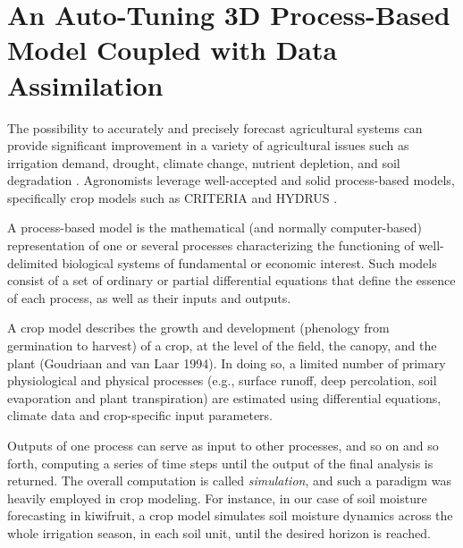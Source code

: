 \chapter{An Auto-Tuning 3D Process-Based Model Coupled with Data Assimilation}
\label{physics-aware-chap:orchard}

The possibility to accurately and precisely forecast agricultural systems can provide significant improvement in a variety of agricultural issues such as irrigation demand, drought, climate change, nutrient depletion, and soil degradation \cite{vitali2021crop}.
Agronomists leverage well-accepted and solid process-based models, specifically crop models such as CRITERIA \cite{Bittelli2011253} and HYDRUS \cite{hydrus2008587}.

\begin{definition}
    A process-based model is the mathematical (and normally computer-based) representation of one or several processes characterizing the functioning of well-delimited biological systems of fundamental or economic interest.
    Such models consist of a set of ordinary or partial differential equations that define the essence of each process, as well as their inputs and outputs.
\end{definition}


\begin{definition}
    A crop model describes the growth and development (phenology from germination to harvest) of a crop, at the level of the field, the canopy, and the plant (Goudriaan and van Laar 1994).
    In doing so, a limited number of primary physiological and physical processes (e.g., surface runoff, deep percolation, soil evaporation and plant transpiration) are estimated using differential equations, climate data and crop-specific input parameters.
\end{definition}


Outputs of one process can serve as input to other processes, and so on and so forth, computing a series of time steps until the output of the final analysis is returned.
The overall computation is called \textit{simulation}, and such a paradigm was heavily employed in crop modeling.
For instance, in our case of soil moisture forecasting in kiwifruit, a crop model simulates soil moisture dynamics across the whole irrigation season, in each soil unit, until the desired horizon is reached.

